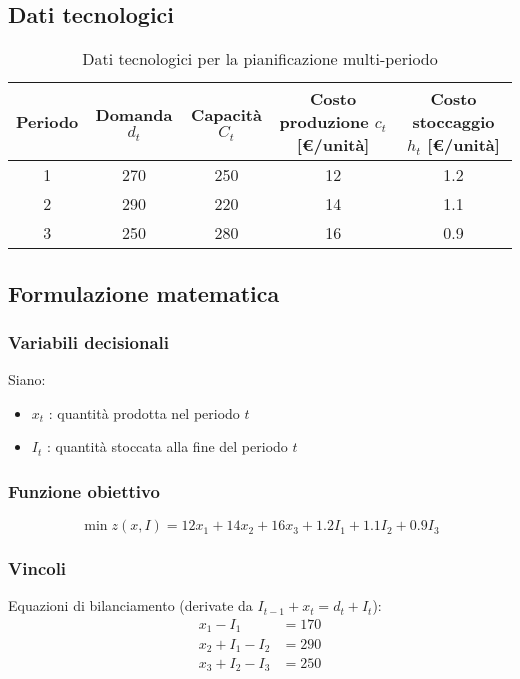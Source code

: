 \subsection{Dati tecnologici}
\begin{table}[h]
\centering
\begin{tabular}{|c|c|c|c|c|}

\hline
Periodo & Domanda $d_t$ & Capacità $C_t$ & Costo produzione $c_t$ [€/unità] & Costo stoccaggio $h_t$ [€/unità] \\
\hline
1 & 270 & 250 & 12 & 1.2 \\
\hline
2 & 290 & 220 & 14 & 1.1 \\
\hline
3 & 250 & 280 & 16 & 0.9 \\
\hline
\end{tabular}
\caption{Dati tecnologici per la pianificazione multi-periodo}
\end{table}

\subsection{Formulazione matematica}
\subsubsection{Variabili decisionali}

Siano:
\begin{itemize}
    \item $x_t$ : quantità prodotta nel periodo $t$
    \item $I_t$ : quantità stoccata alla fine del periodo $t$
\end{itemize}

\subsubsection{Funzione obiettivo}
\[ 
\min z(x, I) = 12x_1 + 14x_2 + 16x_3 + 1.2I_1 + 1.1I_2 + 0.9I_3
\]

\subsubsection{Vincoli}
Equazioni di bilanciamento (derivate da $I_{t-1}+x_t=d_t+I_t$):
\[ 
\begin{aligned}
x_1 - I_1 &= 170 \\
x_2 + I_1 - I_2 &= 290 \\
x_3 + I_2 - I_3 &= 250
\end{aligned}
\]

